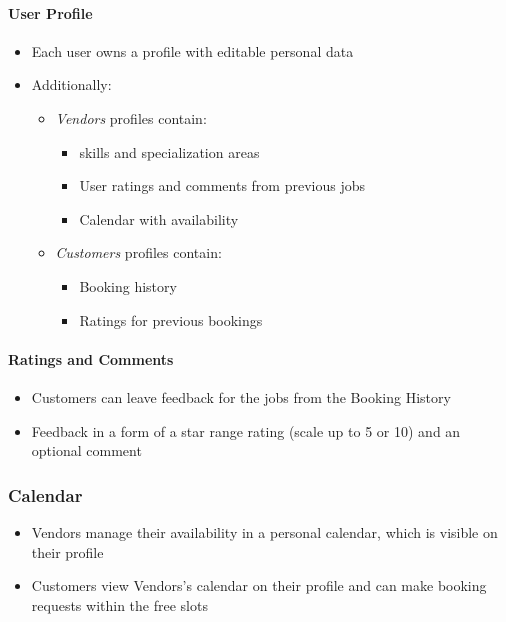 \documentclass[11pt,a4paper]{article}
\begin{document}
\paragraph{User Profile}
\begin{itemize}
  \item Each user owns a profile with editable personal data
  \item Additionally:
    \begin{itemize}
      \item \textit{Vendors} profiles contain:
        \begin{itemize}
          \item skills and specialization areas
          \item User ratings and comments from previous jobs
          \item Calendar with availability
        \end{itemize}
      \item \textit{Customers} profiles contain:
        \begin{itemize}
          \item Booking history
          \item Ratings for previous bookings
        \end{itemize}
    \end{itemize}
\end{itemize}

\paragraph{Ratings and Comments}
\begin{itemize}
  \item Customers can leave feedback for the jobs from the Booking History
  \item Feedback in a form of a star range rating (scale up to 5 or
    10) and an optional comment
\end{itemize}

\subsubsection{Calendar}
\begin{itemize}
  \item Vendors manage their availability in a personal calendar,
    which is visible on their profile
  \item Customers view Vendors's calendar on their profile and can
    make booking requests within the free slots
\end{itemize}
\end{document}
